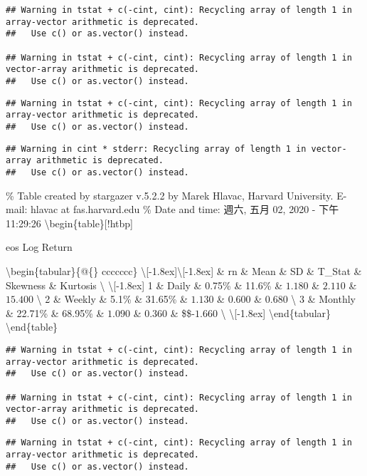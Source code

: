 \documentclass[
]{article}
\begin{document}
\begin{verbatim}
## Warning in tstat + c(-cint, cint): Recycling array of length 1 in array-vector arithmetic is deprecated.
##   Use c() or as.vector() instead.

## Warning in tstat + c(-cint, cint): Recycling array of length 1 in vector-array arithmetic is deprecated.
##   Use c() or as.vector() instead.
\end{verbatim}

\begin{verbatim}
## Warning in tstat + c(-cint, cint): Recycling array of length 1 in array-vector arithmetic is deprecated.
##   Use c() or as.vector() instead.
\end{verbatim}

\begin{verbatim}
## Warning in cint * stderr: Recycling array of length 1 in vector-array arithmetic is deprecated.
##   Use c() or as.vector() instead.
\end{verbatim}

\% Table created by stargazer v.5.2.2 by Marek Hlavac, Harvard
University. E-mail: hlavac at fas.harvard.edu \% Date and time: 週六,
五月 02, 2020 - 下午 11:29:26 \textbackslash begin\{table\}{[}!htbp{]}
\centering 

\caption{eos Log Return} 
  \label{}

\textbackslash begin\{tabular\}\{@\{\extracolsep{5pt}\} ccccccc\}
\textbackslash{[}-1.8ex{]}\hline  \hline \textbackslash{[}-1.8ex{]} \&
rn \& Mean \& SD \& T\_Stat \& Skewness \& Kurtosis \textbackslash{}
\hline \textbackslash{[}-1.8ex{]} 1 \& Daily \& 0.75\% \& 11.6\% \&
\(1.180\) \& \(2.110\) \& \(15.400\) \textbackslash{} 2 \& Weekly \&
5.1\% \& 31.65\% \& \(1.130\) \& \(0.600\) \& \(0.680\) \textbackslash{}
3 \& Monthly \& 22.71\% \& 68.95\% \& \(1.090\) \& \(0.360\) \&
\$\$-\(1.660\) \textbackslash{} \hline \textbackslash{[}-1.8ex{]}
\textbackslash end\{tabular\} \textbackslash end\{table\}

\begin{verbatim}
## Warning in tstat + c(-cint, cint): Recycling array of length 1 in array-vector arithmetic is deprecated.
##   Use c() or as.vector() instead.

## Warning in tstat + c(-cint, cint): Recycling array of length 1 in vector-array arithmetic is deprecated.
##   Use c() or as.vector() instead.
\end{verbatim}

\begin{verbatim}
## Warning in tstat + c(-cint, cint): Recycling array of length 1 in array-vector arithmetic is deprecated.
##   Use c() or as.vector() instead.
\end{verbatim}
\end{document}
